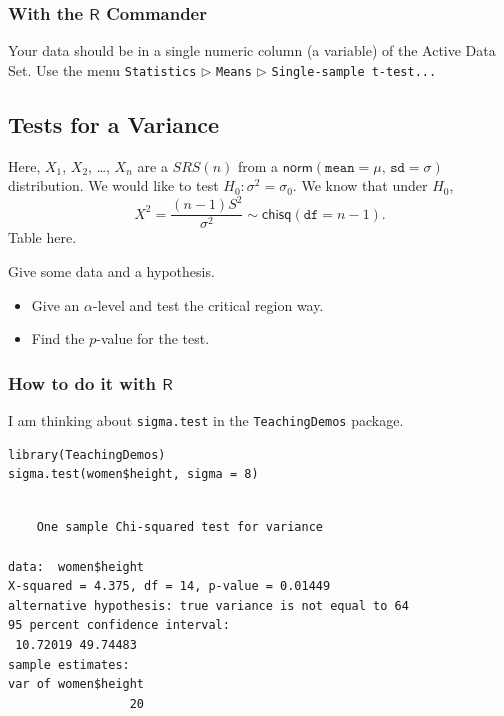 \documentclass[captions=tableheading]{scrbook}
\begin{document}
\subsubsection{With the \(\mathsf{R}\) Commander}
\label{sec-10-3-1-2}


Your data should be in a single numeric column (a variable) of the Active Data Set. Use the menu \texttt{Statistics} \(\triangleright\) \texttt{Means} \(\triangleright\) \texttt{Single-sample t-test...} 
\subsection{Tests for a Variance}
\label{sec-10-3-2}


Here, \(X_{1}\), \(X_{2}\), \ldots{}, \(X_{n}\) are a \(SRS(n)\) from a \(\mathsf{norm}(\mathtt{mean}=\mu,\,\mathtt{sd}=\sigma)\) distribution. We would like to test \(H_{0}:\sigma^{2}=\sigma_{0}\). We know that under \(H_{0}\),
\[
X^{2}=\frac{(n-1)S^{2}}{\sigma^{2}}\sim\mathsf{chisq}(\mathtt{df}=n-1).
\]
Table here.

\begin{example}
Give some data and a hypothesis.
\begin{itemize}
\item Give an \(\alpha\)-level and test the critical region way.
\item Find the \(p\)-value for the test.
\end{itemize}
\end{example}
\subsubsection{How to do it with \(\mathsf{R}\)}
\label{sec-10-3-2-1}

I am thinking about \texttt{sigma.test} in the \texttt{TeachingDemos} package.


\lstset{language=R}
\begin{lstlisting}
library(TeachingDemos)
sigma.test(women$height, sigma = 8)
\end{lstlisting}


\begin{verbatim}

	One sample Chi-squared test for variance

data:  women$height 
X-squared = 4.375, df = 14, p-value = 0.01449
alternative hypothesis: true variance is not equal to 64 
95 percent confidence interval:
 10.72019 49.74483 
sample estimates:
var of women$height 
                 20
\end{verbatim}
\end{document}
